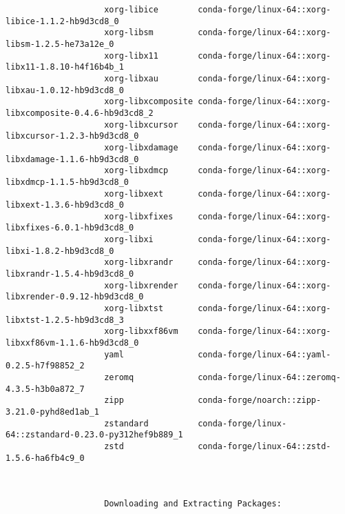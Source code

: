 \documentclass{article}
\begin{document}
\begin{enumerate}
\begin{itemize}
\begin{itemize}
\begin{itemize}
\begin{verbatim}
					xorg-libice        conda-forge/linux-64::xorg-libice-1.1.2-hb9d3cd8_0 
					xorg-libsm         conda-forge/linux-64::xorg-libsm-1.2.5-he73a12e_0 
					xorg-libx11        conda-forge/linux-64::xorg-libx11-1.8.10-h4f16b4b_1 
					xorg-libxau        conda-forge/linux-64::xorg-libxau-1.0.12-hb9d3cd8_0 
					xorg-libxcomposite conda-forge/linux-64::xorg-libxcomposite-0.4.6-hb9d3cd8_2 
					xorg-libxcursor    conda-forge/linux-64::xorg-libxcursor-1.2.3-hb9d3cd8_0 
					xorg-libxdamage    conda-forge/linux-64::xorg-libxdamage-1.1.6-hb9d3cd8_0 
					xorg-libxdmcp      conda-forge/linux-64::xorg-libxdmcp-1.1.5-hb9d3cd8_0 
					xorg-libxext       conda-forge/linux-64::xorg-libxext-1.3.6-hb9d3cd8_0 
					xorg-libxfixes     conda-forge/linux-64::xorg-libxfixes-6.0.1-hb9d3cd8_0 
					xorg-libxi         conda-forge/linux-64::xorg-libxi-1.8.2-hb9d3cd8_0 
					xorg-libxrandr     conda-forge/linux-64::xorg-libxrandr-1.5.4-hb9d3cd8_0 
					xorg-libxrender    conda-forge/linux-64::xorg-libxrender-0.9.12-hb9d3cd8_0 
					xorg-libxtst       conda-forge/linux-64::xorg-libxtst-1.2.5-hb9d3cd8_3 
					xorg-libxxf86vm    conda-forge/linux-64::xorg-libxxf86vm-1.1.6-hb9d3cd8_0 
					yaml               conda-forge/linux-64::yaml-0.2.5-h7f98852_2 
					zeromq             conda-forge/linux-64::zeromq-4.3.5-h3b0a872_7 
					zipp               conda-forge/noarch::zipp-3.21.0-pyhd8ed1ab_1 
					zstandard          conda-forge/linux-64::zstandard-0.23.0-py312hef9b889_1 
					zstd               conda-forge/linux-64::zstd-1.5.6-ha6fb4c9_0 
					
					
					
					Downloading and Extracting Packages:
					

\end{verbatim}
\end{itemize}
\end{itemize}
\end{itemize}
\end{enumerate}
\end{document}
